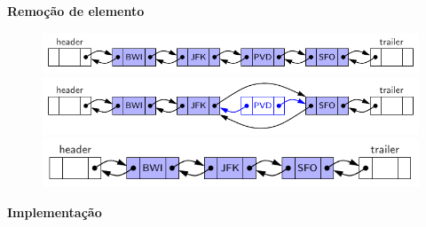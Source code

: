 \textbf{Remoção de elemento}

\begin{figure}[H]
	\centering
	\includegraphics[width=0.7\linewidth]{img/figure-3-22a}
	\includegraphics[width=0.7\linewidth]{img/figure-3-22b}
	\includegraphics[width=0.58\linewidth]{img/figure-3-22c}
\end{figure}


\textbf{Implementação}

\medskip

